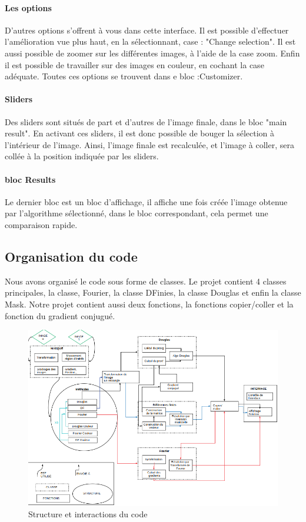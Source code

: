 \paragraph{Les options}
D'autres options s'offrent à vous dans cette interface. Il est possible d'effectuer l'amélioration vue plus haut, en la sélectionnant, case : "Change selection". Il est aussi possible de zoomer sur les différentes images, à l'aide de la case zoom. Enfin il est possible de travailler sur des images en couleur, en cochant la case adéquate. Toutes ces options se trouvent dans e bloc :Customizer.
\paragraph{Sliders}
Des sliders sont situés de part et d'autres de l'image finale, dans le bloc "main result". En activant ces sliders, il est donc possible de bouger la sélection à l'intérieur de l'image. Ainsi, l'image finale est recalculée, et l'image à coller, sera collée à la position indiquée par les sliders.
\paragraph{bloc Results}
Le dernier bloc est un bloc d'affichage, il affiche une fois créée l'image obtenue par l'algorithme sélectionné, dans le bloc correspondant, cela permet une comparaison rapide.
\subsection{Organisation du code}
Nous avons organisé le code sous forme de classes. Le projet contient 4 classes principales, la classe, Fourier, la classe DFinies, la classe Douglas et enfin la classe  Mask. Notre projet contient aussi deux fonctions, la fonctions copier/coller et la fonction du gradient conjugué.


\begin{figure}
\includegraphics[scale=0.65]{Images/code/schema.png}
\caption{Structure et interactions du code}
\end{figure}
\newpage

